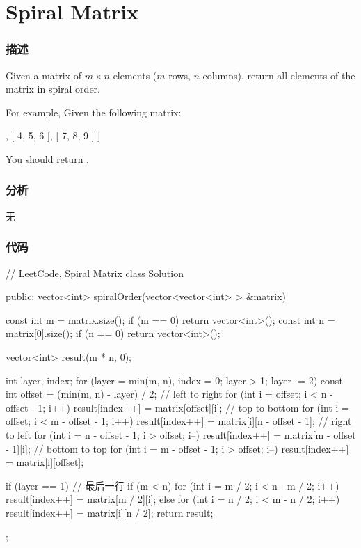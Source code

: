 \section{Spiral Matrix} %
\label{sec:spiral-matrix}


\subsubsection{描述}
Given a matrix of $m \times n$ elements ($m$ rows, $n$ columns), return all elements of the matrix in spiral order.

For example,
Given the following matrix:
\begin{Code}
[
 [ 1, 2, 3 ],
 [ 4, 5, 6 ],
 [ 7, 8, 9 ]
]
\end{Code}
You should return \fn{[1,2,3,6,9,8,7,4,5]}.


\subsubsection{分析}
无

\subsubsection{代码}
\begin{Code}
// LeetCode, Spiral Matrix
class Solution {
public:
    vector<int> spiralOrder(vector<vector<int> > &matrix) {
        const int m = matrix.size();
        if (m == 0) return vector<int>();
        const int n = matrix[0].size();
        if (n == 0) return vector<int>();

        vector<int> result(m * n, 0);

        int layer, index;
        for (layer = min(m, n), index = 0; layer > 1; layer -= 2) {
            const int offset = (min(m, n) - layer) / 2;
            // left to right
            for (int i = offset; i < n - offset - 1; i++)
                result[index++] = matrix[offset][i];
            // top to bottom
            for (int i = offset; i < m - offset - 1; i++)
                result[index++] = matrix[i][n - offset - 1];
            // right to left
            for (int i = n - offset - 1; i > offset; i--)
                result[index++] = matrix[m - offset - 1][i];
            // bottom to top
            for (int i = m - offset - 1; i > offset; i--)
                result[index++] = matrix[i][offset];
        }

        if (layer == 1) {  // 最后一行
            if (m < n)
                for (int i = m / 2; i < n - m / 2; i++)
                    result[index++] = matrix[m / 2][i];
            else
                for (int i = n / 2; i < m - n / 2; i++)
                       result[index++] = matrix[i][n / 2];
        }
        return result;
    }
};
\end{Code}


